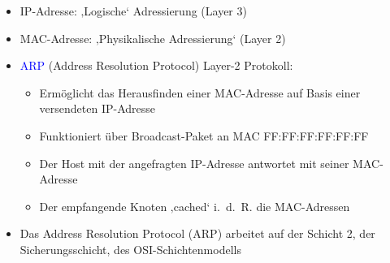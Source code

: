 
\begin{itemize}
    \item IP-Adresse: ‚Logische‘ Adressierung (Layer 3)
    \item MAC-Adresse: ‚Physikalische Adressierung‘ (Layer 2)
\end{itemize}

\begin{itemize}
    \item \textcolor{blue}{ARP} (Address Resolution Protocol) Layer-2 Protokoll:
    \begin{itemize}
        \item Ermöglicht das Herausfinden einer MAC-Adresse auf Basis einer versendeten IP-Adresse
        \item Funktioniert über Broadcast-Paket an MAC FF:FF:FF:FF:FF:FF
        \item Der Host mit der angefragten IP-Adresse antwortet mit seiner MAC-Adresse
        \item Der empfangende Knoten ‚cached‘ i.\ d.\ R. die MAC-Adressen
    \end{itemize}
\end{itemize}

\begin{itemize}
    \item Das Address Resolution Protocol (ARP) arbeitet auf der Schicht 2, der Sicherungsschicht, des OSI-Schichtenmodells
\end{itemize}

